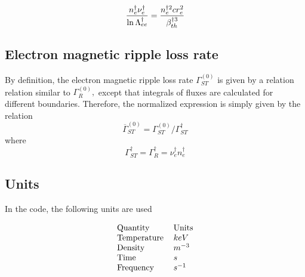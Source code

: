 \begin{equation}
\frac{n_{e}^{\dag }\nu _{e}^{\dag }}{\ln \Lambda _{ee}^{\dag }}=\frac{%
n_{e}^{\dag 2}cr_{e}^{2}}{\beta _{th}^{\dag 3}}
\end{equation}

\subsection{Electron magnetic ripple loss rate}

By definition, the electron magnetic ripple loss rate $\Gamma _{ST}^{\left(
0\right) }$ is given by a relation relation similar to $\Gamma _{R}^{\left(
0\right) },$ except that integrals of fluxes are calculated for different
boundaries. Therefore, the normalized expression is simply given by the
relation 
\begin{equation}
\overline{\Gamma }_{ST}^{\left( 0\right) }=\Gamma _{ST}^{\left( 0\right)
}/\Gamma _{ST}^{\dag }
\end{equation}
where 
\begin{equation}
\Gamma _{ST}^{\dag }=\Gamma _{R}^{\dag }=\nu _{e}^{\dag }n_{e}^{\dag }
\end{equation}

\subsection{Units}

In the code, the following units are used

\begin{equation*}
\begin{tabular}{ll}
Quantity & Units \\ 
Temperature & $keV$ \\ 
Density & $m^{-3}$ \\ 
Time & $s$ \\ 
Frequency & $s^{-1}$%
\end{tabular}
\end{equation*}
